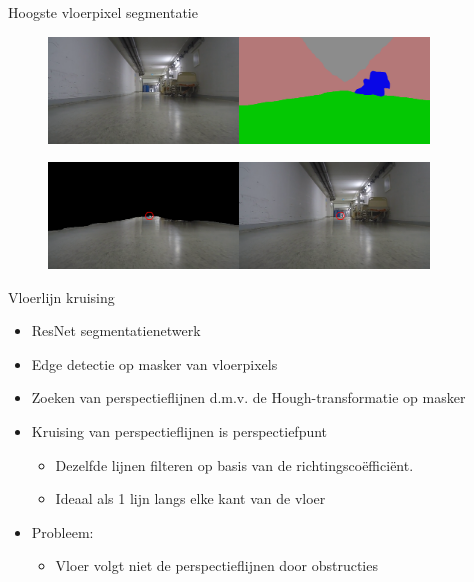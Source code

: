 \documentclass[11pt,t]{beamer}
\begin{document}
\begin{frame}[fragile]{Hoogste vloerpixel segmentatie}
	\begin{figure}
		\centering
		\tiny
		\includegraphics[width=0.9\textwidth]{graphics/segmentatie.png}
	\end{figure}
	\begin{figure}
		\centering
		\includegraphics[width=0.9\textwidth]{graphics/seg_highest.png}
	\end{figure}
\end{frame}

\begin{frame}[fragile]{Vloerlijn kruising}
	\begin{itemize}
		\item ResNet segmentatienetwerk
		\item Edge detectie op masker van vloerpixels
		\item Zoeken van perspectieflijnen d.m.v. de Hough-transformatie op masker
		\item Kruising van perspectieflijnen is perspectiefpunt
		\begin{itemize}
			\item Dezelfde lijnen filteren op basis van de richtingsco\"{e}ffici\"{e}nt.
			\item Ideaal als 1 lijn langs elke kant van de vloer
		\end{itemize}
		
		\item Probleem:
		\begin{itemize}
			\item Vloer volgt niet de perspectieflijnen door obstructies
		\end{itemize}
		
	\end{itemize}
\end{frame}
\end{document}
